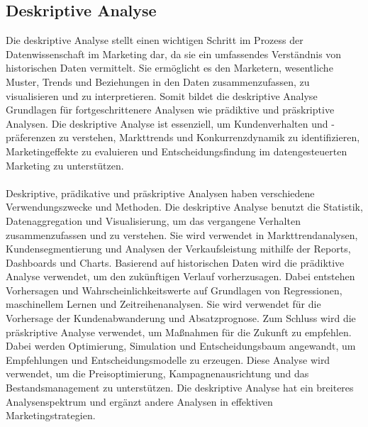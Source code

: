 \subsection{Deskriptive Analyse}
\label{deskriptiveanalyse}
Die deskriptive Analyse stellt einen wichtigen Schritt im Prozess der Datenwissenschaft im Marketing dar, da sie ein umfassendes Verständnis von historischen Daten vermittelt. Sie ermöglicht es den Marketern, wesentliche Muster, Trends und Beziehungen in den Daten zusammenzufassen, zu visualisieren und zu interpretieren. Somit bildet die deskriptive Analyse Grundlagen für fortgeschrittenere Analysen wie prädiktive und präskriptive Analysen. Die deskriptive Analyse ist essenziell, um Kundenverhalten und -präferenzen zu verstehen, Markttrends und Konkurrenzdynamik zu identifizieren, Marketingeffekte zu evaluieren und Entscheidungsfindung im datengesteuerten Marketing zu unterstützen\cite{brown2024mastering}. \\\\
Deskriptive, prädikative und präskriptive Analysen haben verschiedene Verwendungszwecke und Methoden. Die deskriptive Analyse benutzt die Statistik, Datenaggregation und Visualisierung, um das vergangene Verhalten zusammenzufassen und zu verstehen. Sie wird verwendet in Markttrendanalysen, Kundensegmentierung und Analysen der Verkaufsleistung mithilfe der Reports, Dashboards und Charts. Basierend auf historischen Daten wird die prädiktive Analyse verwendet, um den zukünftigen Verlauf vorherzusagen. Dabei entstehen Vorhersagen und Wahrscheinlichkeitswerte auf Grundlagen von Regressionen, maschinellem Lernen und Zeitreihenanalysen. Sie wird verwendet für die Vorhersage der Kundenabwanderung und Absatzprognose. Zum Schluss wird die präskriptive Analyse verwendet, um Maßnahmen für die Zukunft zu empfehlen. Dabei werden Optimierung, Simulation und Entscheidungsbaum angewandt, um Empfehlungen und Entscheidungsmodelle zu erzeugen. Diese Analyse wird verwendet, um die Preisoptimierung, Kampagnenausrichtung und das Bestandsmanagement zu unterstützen. Die deskriptive Analyse hat ein breiteres Analysenspektrum und ergänzt andere Analysen in effektiven Marketingstrategien\cite[S. 51 ff]{brown2024mastering}. 


